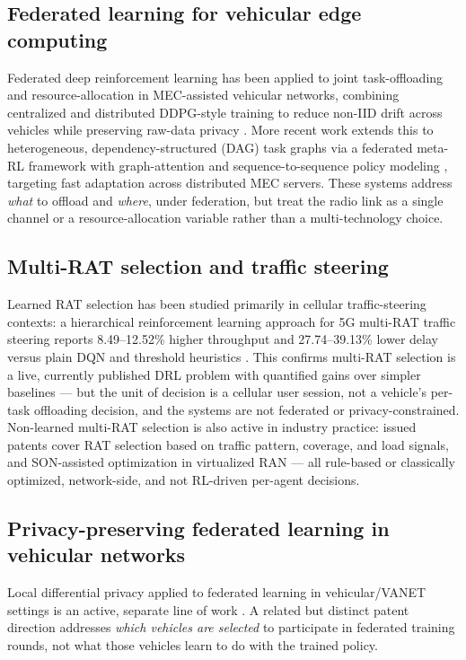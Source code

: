 \documentclass[10pt,twocolumn]{article}
\begin{document}
\subsection{Federated learning for vehicular edge computing}
Federated deep reinforcement learning has been applied to joint task-offloading and
resource-allocation in MEC-assisted vehicular networks, combining centralized and distributed
DDPG-style training to reduce non-IID drift across vehicles while preserving raw-data privacy
\cite{jnca2024fedoffload}. More recent work extends this to heterogeneous, dependency-structured
(DAG) task graphs via a federated meta-RL framework with graph-attention and sequence-to-sequence
policy modeling \cite{fedmags2026}, targeting fast adaptation across distributed MEC servers. These
systems address \emph{what} to offload and \emph{where}, under federation, but treat the radio link
as a single channel or a resource-allocation variable rather than a multi-technology choice.

\subsection{Multi-RAT selection and traffic steering}
Learned RAT selection has been studied primarily in cellular traffic-steering contexts: a
hierarchical reinforcement learning approach for 5G multi-RAT traffic steering reports 8.49--12.52\%
higher throughput and 27.74--39.13\% lower delay versus plain DQN and threshold heuristics
\cite{hrlmultirat2024}. This confirms multi-RAT selection is a live, currently published DRL
problem with quantified gains over simpler baselines --- but the unit of decision is a cellular
user session, not a vehicle's per-task offloading decision, and the systems are not federated or
privacy-constrained. Non-learned multi-RAT selection is also active in industry practice: issued
patents \cite{uspatent_verizon,uspatent_son} cover RAT selection based on traffic pattern, coverage,
and load signals, and SON-assisted optimization in virtualized RAN --- all rule-based or
classically optimized, network-side, and not RL-driven per-agent decisions.

\subsection{Privacy-preserving federated learning in vehicular networks}
Local differential privacy applied to federated learning in vehicular/VANET settings is an active,
separate line of work \cite{ldpvanet2023}. A related but distinct patent direction
\cite{uspatent_vehiclefl} addresses \emph{which vehicles are selected} to participate in federated
training rounds, not what those vehicles learn to do with the trained policy.
\end{document}
